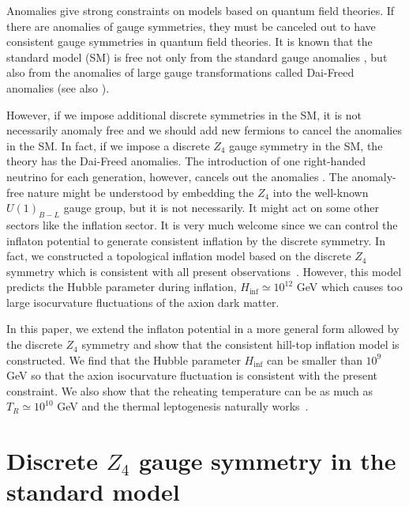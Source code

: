 \documentclass[11pt,a4paper]{article}
\begin{document}
Anomalies give strong constraints on models based on quantum field theories. If there are anomalies of gauge symmetries, they must be canceled out to have consistent gauge symmetries in quantum field theories. It is known that the standard model (SM) is free not only from the standard gauge anomalies \cite{Adler:1969gk,Bell:1969ts}, but also from the anomalies of large gauge transformations called  Dai-Freed anomalies \cite{Dai:1994kq,Witten:2015aba} (see also \cite{Yonekura:2016wuc}).

However, if we impose additional discrete symmetries in the SM, it is not necessarily anomaly free and we should add new fermions to cancel the anomalies in the SM. 
In fact, if we impose a discrete $Z_4$ gauge symmetry in the SM, the theory has the Dai-Freed anomalies. 
The introduction of one right-handed neutrino for each generation, however, cancels out the anomalies \cite{Garcia-Etxebarria:2018ajm}. 
The anomaly-free nature might be understood by embedding the $Z_4$ into the well-known $U(1)_{B-L}$ gauge group, but it is not necessarily. 
It might act on some other sectors like the inflation sector. 
It is very much welcome since we can control the inflaton potential to generate consistent inflation by the discrete symmetry. 
In fact, we constructed a topological inflation model based on the discrete $Z_4$ symmetry which is consistent with all present observations~\cite{Kawasaki:2023mjm}. 
However, this model predicts the Hubble parameter during inflation, $H_\mathrm{inf} \simeq 10^{12}$ GeV which causes too large isocurvature fluctuations of the axion dark matter.

In this paper, we extend the inflaton potential in a more general form allowed by the discrete $Z_4$ symmetry and show that the consistent hill-top inflation model is constructed. We find that the Hubble parameter $H_\mathrm{inf}$ can be smaller than $10^{9}$ GeV so that the axion isocurvature fluctuation is consistent with the present constraint. We also show that the reheating temperature can be as much as $T_R\simeq 10^{10}$ GeV and the thermal leptogenesis naturally works~\cite{Fukugita:1986hr}.




\section{Discrete \texorpdfstring{$Z_4$}{Z4} gauge symmetry in the standard model}
\label{sec:discrete_Z4}
\end{document}
